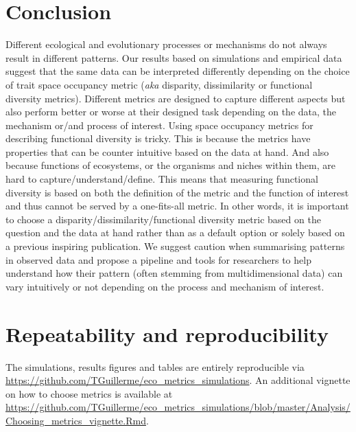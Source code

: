 \documentclass[12pt,letterpaper]{article}
\begin{document}
\section{Conclusion}
Different ecological and evolutionary processes or mechanisms do not always result in different patterns.
Our results based on simulations and empirical data suggest that the same data can be interpreted differently depending on the choice of trait space occupancy metric (\textit{aka} disparity, dissimilarity or functional diversity metrics).
Different metrics are designed to capture different aspects \citep{guillerme2020shifting,mammola2021concepts} but also perform better or worse at their designed task depending on the data, the mechanism or/and process of interest.
Using space occupancy metrics for describing functional diversity is tricky.
This is because the metrics have properties that can be counter intuitive based on the data at hand.
And also because functions of ecosystems, or the organisms and niches within them, are hard to capture/understand/define.
This means that measuring functional diversity is based on both the definition of the metric and the function of interest and thus cannot be served by a one-fits-all metric.
In other words, it is important to choose a disparity/dissimilarity/functional diversity metric based on the question and the data at hand rather than as a default option or solely based on a previous inspiring publication.
We suggest caution when summarising patterns in observed data and propose a pipeline and tools for researchers to help understand how their pattern (often stemming from multidimensional data) can vary intuitively or not depending on the process and mechanism of interest.

\section{Repeatability and reproducibility}
The simulations, results figures and tables are entirely reproducible via \url{https://github.com/TGuillerme/eco_metrics_simulations}.
An additional vignette on how to choose metrics is available at \url{https://github.com/TGuillerme/eco_metrics_simulations/blob/master/Analysis/Choosing_metrics_vignette.Rmd}.







\end{document}
